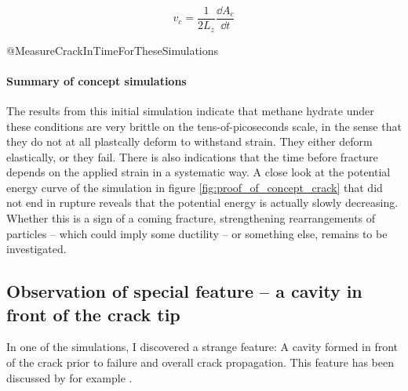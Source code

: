 \begin{equation}
v_c = \frac{1}{2L_z}\frac{\dd A_c}{\dd t}
\end{equation}

@MeasureCrackInTimeForTheseSimulations

\paragraph{Summary of concept simulations} The results from this initial simulation indicate that methane hydrate under these conditions are very brittle on the tens-of-picoseconds scale, in the sense that they do not at all plastcally deform to withstand strain. They either deform elastically, or they fail. There is also indications that the time before fracture depends on the applied strain in a systematic way. A close look at the potential energy curve of the simulation in figure \ref{fig:proof_of_concept_crack} that did not end in rupture reveals that the potential energy is actually slowly decreasing. Whether this is a sign of a coming fracture, strengthening rearrangements of particles -- which could imply some ductility -- or something else, remains to be investigated. 

\subsection{Observation of special feature -- a cavity in front of the crack tip}
In one of the simulations, I discovered a strange feature: A cavity formed in front of the crack prior to failure and overall crack propagation. This feature has been discussed by for example \citet{Bouchbinder2004}.


